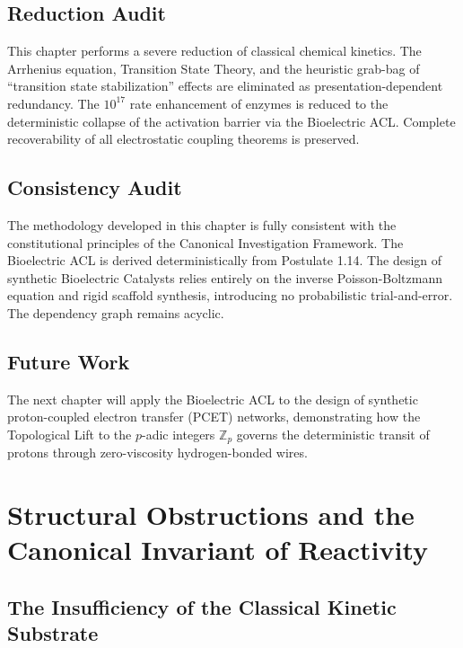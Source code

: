 \documentclass[11pt,openany]{extbook}
\newenvironment{reductionaudit}{\section*{Reduction Audit}}{}
\newenvironment{consistencyaudit}{\section*{Consistency Audit}}{}
\newenvironment{futurework}{\section*{Future Work}}{}
\theoremstyle{plain}
\theoremstyle{definition}
\begin{document}
\begin{reductionaudit}
This chapter performs a severe reduction of classical chemical kinetics. The Arrhenius equation, Transition State Theory, and the heuristic grab-bag of ``transition state stabilization'' effects are eliminated as presentation-dependent redundancy. The $10^{17}$ rate enhancement of enzymes is reduced to the deterministic collapse of the activation barrier via the Bioelectric ACL. Complete recoverability of all electrostatic coupling theorems is preserved.
\end{reductionaudit}

\begin{consistencyaudit}
The methodology developed in this chapter is fully consistent with the constitutional principles of the Canonical Investigation Framework. The Bioelectric ACL is derived deterministically from Postulate 1.14. The design of synthetic Bioelectric Catalysts relies entirely on the inverse Poisson-Boltzmann equation and rigid scaffold synthesis, introducing no probabilistic trial-and-error. The dependency graph remains acyclic.
\end{consistencyaudit}

\begin{futurework}
The next chapter will apply the Bioelectric ACL to the design of synthetic proton-coupled electron transfer (PCET) networks, demonstrating how the Topological Lift to the $p$-adic integers $\mathbb{Z}_p$ governs the deterministic transit of protons through zero-viscosity hydrogen-bonded wires.
\end{futurework}

\chapter{Structural Obstructions and the Canonical Invariant of Reactivity}

\section{The Insufficiency of the Classical Kinetic Substrate}
\end{document}
